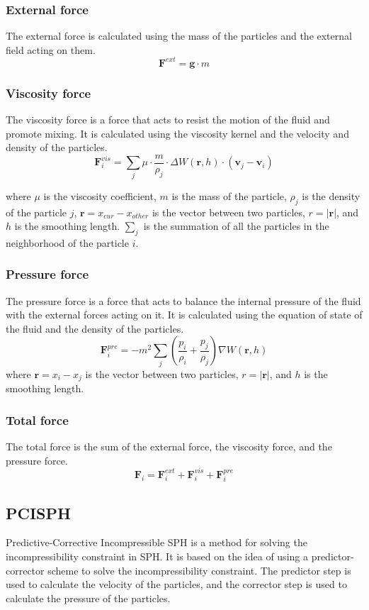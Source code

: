 \documentclass[acmtog]{acmart}
\begin{document}
\subsubsection{External force}
The external force is calculated using the mass of the particles and the external field acting on them.
\[
	\boldsymbol{F}^{ext} = \boldsymbol{g} \cdot m
\]
\subsubsection{Viscosity force}
The viscosity force is a force that acts to resist the motion of the fluid and promote mixing. It is calculated using the viscosity kernel and the velocity and density of the particles.
\[
	\boldsymbol{F}^{vis}_i = \sum_j \mu \cdot \frac{m}{\rho_j} \cdot \Delta W(\boldsymbol{r},h) \cdot (\boldsymbol{v}_{j} - \boldsymbol{v}_{i})
\]

where $\mu$ is the viscosity coefficient, $m$ is the mass of the particle, $\rho_j$ is the density of the particle $j$, $\boldsymbol{r}=x_{cur} - x_{other}$ is the vector between two particles, $r=|\boldsymbol{r}|$, and $h$ is the smoothing length.
$\sum_j$ is the summation of all the particles in the neighborhood of the particle $i$.

\subsubsection{Pressure force}
The pressure force is a force that acts to balance the internal pressure of the fluid with the external forces acting on it. It is calculated using the equation of state of the fluid and the density of the particles.
\[
	\boldsymbol{F}^{pre}_i = -m^2 \sum_j (\frac{p_i}{\rho_i} + \frac{p_j}{\rho_j})\nabla W(\boldsymbol{r},h)
\]
where $\boldsymbol{r}=x_{i} - x_{j}$ is the vector between two particles, $r=|\boldsymbol{r}|$, and $h$ is the smoothing length.

\subsubsection{Total force}
The total force is the sum of the external force, the viscosity force, and the pressure force.
\[
	\boldsymbol{F}_i = \boldsymbol{F}^{ext}_i + \boldsymbol{F}^{vis}_i + \boldsymbol{F}^{pre}_i
\]

\subsection{PCISPH}
Predictive-Corrective Incompressible SPH is a method for solving the incompressibility constraint in SPH.
It is based on the idea of using a predictor-corrector scheme to solve the incompressibility constraint.
The predictor step is used to calculate the velocity of the particles, and the corrector step is used to calculate the pressure of the particles.
\end{document}

